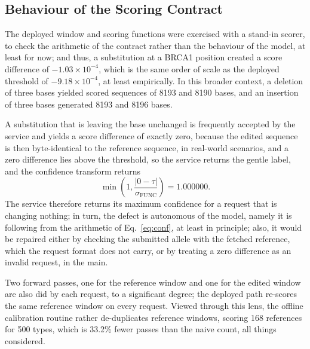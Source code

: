 \documentclass[10pt,journal]{IEEEtran}
\begin{document}
\subsection{Behaviour of the Scoring Contract}
\label{sec:res-contract}

The deployed window and scoring functions were exercised with a stand-in scorer, to check the arithmetic of the contract rather than the behaviour of the model, at least for now; and thus, a substitution at a BRCA1 position created a score difference of $-1.03\times10^{-4}$, which is the same order of scale as the deployed threshold of $-9.18\times10^{-4}$, at least empirically. In this broader context, a deletion of three bases yielded scored sequences of 8193 and 8190 bases, and an insertion of three bases generated 8193 and 8196 bases.

A substitution that is leaving the base unchanged is frequently accepted by the service and yields a score difference of exactly zero, because the edited sequence is then byte-identical to the reference sequence, in real-world scenarios, and a zero difference lies above the threshold, so the service returns the gentle label, and the confidence transform returns
\begin{equation}
\min\!\left(1,\frac{|0-\tau|}{\sigma_{\mathrm{FUNC}}}\right)=1.000000.
\label{eq:noop}
\end{equation}
The service therefore returns its maximum confidence for a request that is changing nothing; in turn, the defect is autonomous of the model, namely it is following from the arithmetic of Eq.~\eqref{eq:conf}, at least in principle; also, it would be repaired either by checking the submitted allele with the fetched reference, which the request format does not carry, or by treating a zero difference as an invalid request, in the main.

Two forward passes, one for the reference window and one for the edited window are also did by each request, to a significant degree; the deployed path re-scores the same reference window on every request. Viewed through this lens, the offline calibration routine rather de-duplicates reference windows, scoring 168 references for 500 types, which is 33.2\% fewer passes than the naive count, all things considered.
\end{document}
